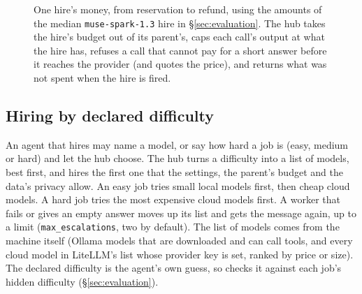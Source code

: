 \begin{figure}[!htb]
\centering
{}
\caption{One hire's money, from reservation to refund, using the amounts of the median \texttt{muse-spark-1.3} hire in
\S\ref{sec:evaluation}. The hub takes the hire's budget out of its parent's, caps each call's output at what the hire
has, refuses a call that cannot pay for a short answer before it reaches the provider (and quotes the price), and
returns what was not spent when the hire is fired.}
\label{fig:hire}
\end{figure}

\subsection{Hiring by declared difficulty}
An agent that hires may name a model, or say how hard a job is (easy, medium or hard) and let the hub choose. The hub
turns a difficulty into a list of models, best first, and hires the first one that the settings, the parent's budget
and the data's privacy allow. An easy job tries small local models first, then cheap cloud models. A hard job tries the
most expensive cloud models first. A worker that fails or gives an empty answer moves up its list and gets the message
again, up to a limit (\texttt{max\_escalations}, two by default). The list of models comes from the machine itself
(Ollama models that are downloaded and can call tools, and every cloud model in LiteLLM's list whose provider key is
set, ranked by price or size). The declared difficulty is the agent's own guess, so \bench{} checks it against each
job's hidden difficulty (\S\ref{sec:evaluation}).

